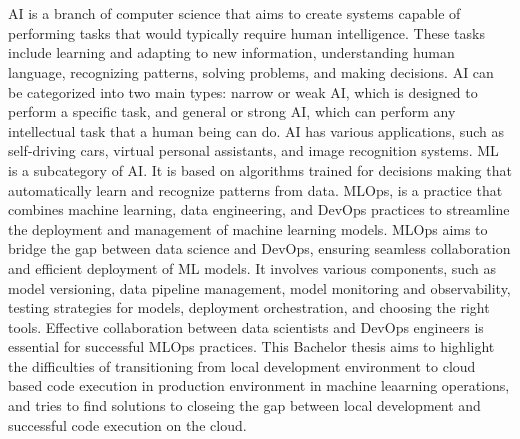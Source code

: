 \chapter{\abstractname}

\ac{AI} is a branch of computer science that aims to create systems capable of performing tasks that would typically require human intelligence. These tasks include learning and adapting to new information, understanding human language, recognizing patterns, solving problems, and making decisions. \ac{AI} can be categorized into two main types: narrow or weak \ac{AI}, which is designed to perform a specific task, and general or strong \ac{AI}, which can perform any intellectual task that a human being can do. AI has various applications, such as self-driving cars, virtual personal assistants, and image recognition systems.
\newline
\ac{ML} is a subcategory of \ac{AI}. It is based on algorithms trained for decisions making that automatically learn and recognize patterns from data. 
\newline
\ac{MLOps}, is a practice that combines machine learning, data engineering, and DevOps practices to streamline the deployment and management of machine learning models. \ac{MLOps} aims to bridge the gap between data science and DevOps, ensuring seamless collaboration and efficient deployment of \ac{ML} models. It involves various components, such as model versioning, data pipeline management, model monitoring and observability, testing strategies for models, deployment orchestration, and choosing the right tools. Effective collaboration between data scientists and DevOps engineers is essential for successful \ac{MLOps} practices.
\newline
\newline
This Bachelor thesis aims to highlight the difficulties of transitioning from local development environment to cloud based code execution in production environment in machine leaarning operations, and tries to find solutions to closeing the gap between local development and successful code execution on the cloud.
